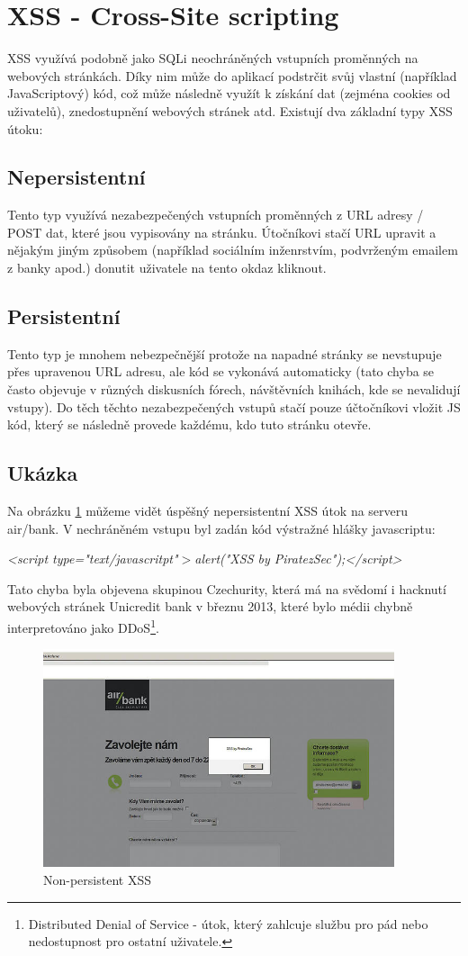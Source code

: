 \documentclass[12pt, a4paper]{report}
\begin{document}
\section{XSS - Cross-Site scripting}
XSS využívá podobně jako SQLi neochráněných vstupních proměnných na webových stránkách. Díky nim může do aplikací podstrčit svůj vlastní (například JavaScriptový) kód, což může následně využít k získání dat (zejména cookies od uživatelů), znedostupnění webových stránek atd. Existují dva základní typy XSS útoku:

\subsection{Nepersistentní}
Tento typ využívá nezabezpečených vstupních proměnných z URL adresy / POST dat, které jsou vypisovány na stránku. Útočníkovi stačí URL upravit a nějakým jiným způsobem (například sociálním inženrstvím, podvrženým emailem z banky apod.) donutit uživatele na tento okdaz kliknout. 

\subsection{Persistentní}
Tento typ je mnohem nebezpečnější protože na napadné stránky se nevstupuje přes upravenou URL adresu, ale kód se vykonává automaticky (tato chyba se často objevuje v různých diskusních fórech, návštěvních knihách, kde se nevalidují vstupy). Do těch těchto nezabezpečených vstupů stačí pouze účtočníkovi vložit JS kód, který se následně provede každému, kdo tuto stránku otevře. 

\subsection{Ukázka}
Na obrázku \ref{obr.airbank} můžeme vidět úspěšný nepersistentní XSS útok na serveru air/bank. V nechráněném vstupu byl zadán kód výstražné hlášky javascriptu:
\begin{center}
\textit{<script type="text/javascritpt"$>$alert("XSS by PiratezSec");</script>}
\end{center}
Tato chyba byla objevena skupinou Czechurity, která má na svědomí i hacknutí webových stránek Unicredit bank v březnu 2013, které bylo médii chybně interpretováno jako DDoS\footnote{Distributed Denial of Service - útok, který zahlcuje službu pro pád nebo nedostupnost pro ostatní uživatele.}.
\begin{figure}
\includegraphics[width=390px]{./examples/xss-airbank.png}
\caption{Non-persistent XSS}
\label{obr.airbank}
\end{figure}
\end{document}
